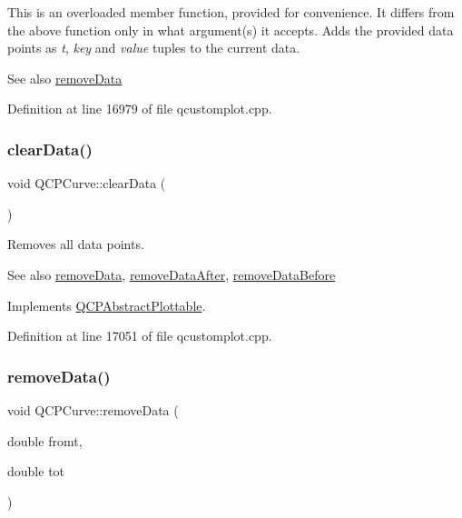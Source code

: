 This is an overloaded member function, provided for convenience. It differs from the above function only in what argument(s) it accepts. Adds the provided data points as {\itshape t}, {\itshape key} and {\itshape value} tuples to the current data. \begin{DoxySeeAlso}{See also}
\hyperlink{class_q_c_p_curve_ad45bb5479be799163028ef2b776f7221}{remove\+Data} 
\end{DoxySeeAlso}


Definition at line 16979 of file qcustomplot.\+cpp.

\mbox{\label{class_q_c_p_curve_ae0462c61dbfbac07db0736ec64110241}} 
\subsubsection{\texorpdfstring{clear\+Data()}{clearData()}}
{\footnotesize\ttfamily void Q\+C\+P\+Curve\+::clear\+Data (\begin{DoxyParamCaption}{ }\end{DoxyParamCaption})\hspace{0.3cm}{\ttfamily [virtual]}}

Removes all data points. \begin{DoxySeeAlso}{See also}
\hyperlink{class_q_c_p_curve_ad45bb5479be799163028ef2b776f7221}{remove\+Data}, \hyperlink{class_q_c_p_curve_a0365cb947c4e6d405ee22e00191d5f52}{remove\+Data\+After}, \hyperlink{class_q_c_p_curve_af6f4284fbc2f34e676f24dce03c34fe5}{remove\+Data\+Before} 
\end{DoxySeeAlso}


Implements \hyperlink{class_q_c_p_abstract_plottable_a86e5b8fd4b6ff4f4084e7ea4c573fc53}{Q\+C\+P\+Abstract\+Plottable}.



Definition at line 17051 of file qcustomplot.\+cpp.

\mbox{\label{class_q_c_p_curve_ad45bb5479be799163028ef2b776f7221}} 
\subsubsection{\texorpdfstring{remove\+Data()}{removeData()}\hspace{0.1cm}{\footnotesize\ttfamily [1/2]}}
{\footnotesize\ttfamily void Q\+C\+P\+Curve\+::remove\+Data (\begin{DoxyParamCaption}\item[{double}]{fromt,  }\item[{double}]{tot }\end{DoxyParamCaption})}

